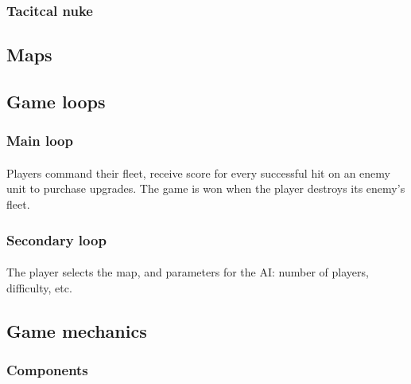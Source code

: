 \documentclass{article}[10pt]
\begin{document}
\subsubsection{Tacitcal nuke}
\paragraph{}

\subsection{Maps}
\paragraph{}

\subsection{Game loops}
\subsubsection{Main loop}
\paragraph{}
Players command their fleet, receive score for every successful hit on an enemy unit to purchase upgrades. The game is won when the player destroys its enemy's fleet.

\subsubsection{Secondary loop}
\paragraph{}
The player selects the map, and parameters for the AI: number of players, difficulty, etc.

\subsection{Game mechanics}
\subsubsection{Components}
\paragraph{}
\end{document}
